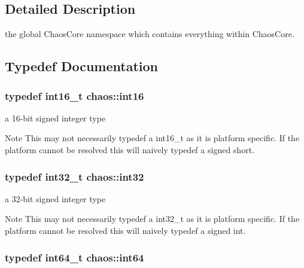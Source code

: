 \subsection{Detailed Description}
the global Chaos\+Core namespace which contains everything within Chaos\+Core. 

\subsection{Typedef Documentation}
\hypertarget{namespacechaos_a23112b8188c8a6ad32a86041fb4c088e}{}
\subsubsection[{int16}]{\setlength{\rightskip}{0pt plus 5cm}typedef int16\+\_\+t {\bf chaos\+::int16}}\label{namespacechaos_a23112b8188c8a6ad32a86041fb4c088e}


a 16-\/bit signed integer type 

\begin{DoxyNote}{Note}
This may not necessarily {\ttfamily typedef} a {\ttfamily int16\+\_\+t} as it is platform specific. If the platform cannot be resolved this will naively {\ttfamily typedef} a {\ttfamily signed short}. 
\end{DoxyNote}
\hypertarget{namespacechaos_ad1de7efb430365afd2c9446a0f522a90}{}
\subsubsection[{int32}]{\setlength{\rightskip}{0pt plus 5cm}typedef int32\+\_\+t {\bf chaos\+::int32}}\label{namespacechaos_ad1de7efb430365afd2c9446a0f522a90}


a 32-\/bit signed integer type 

\begin{DoxyNote}{Note}
This may not necessarily {\ttfamily typedef} a {\ttfamily int32\+\_\+t} as it is platform specific. If the platform cannot be resolved this will naively {\ttfamily typedef} a {\ttfamily signed int}. 
\end{DoxyNote}
\hypertarget{namespacechaos_a46c61f58d99879b936f58234b9a05e0c}{}
\subsubsection[{int64}]{\setlength{\rightskip}{0pt plus 5cm}typedef int64\+\_\+t {\bf chaos\+::int64}}\label{namespacechaos_a46c61f58d99879b936f58234b9a05e0c}


